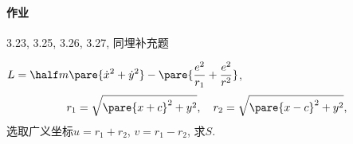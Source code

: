 \documentclass{ctexart}
\begin{document}

\paragraph{作业} %
\label{par:作业}

3.23, 3.25, 3.26, 3.27, 同埋补充题
\begin{ex}
    $\displaystyle L = \half m\pare{\dot{x}^2 + \dot{y}^2} - \pare{\frac{e^2}{r_1} + \frac{e^2}{r^2}}$,
    \[ r_1 = \sqrt{\pare{x+c}^2 + y^2},\quad r_2 = \sqrt{\pare{x-c}^2 + y^2}, \]
    选取广义坐标$u = r_1 + r_2$, $v = r_1 - r_2$, 求$S$.\\
    \centerline{}
\end{ex}

\end{document}

